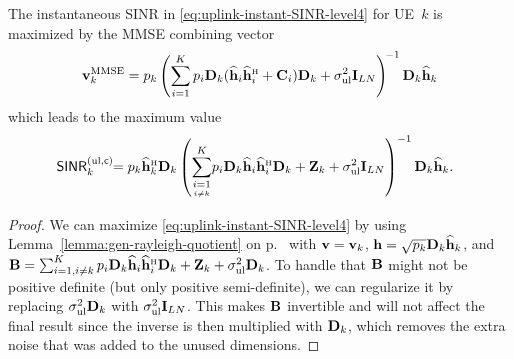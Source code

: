 \begin{corollary} \label{cor:MMSE-combining}
The instantaneous SINR in \eqref{eq:uplink-instant-SINR-level4} for UE~$k$ is maximized by the MMSE combining vector
\begin{equation} \label{eq:MMSE-combining}
\vect{v}_{k}^{{\rm MMSE}} =    p_{k} \left( \sum\limits_{i=1}^{K} p_{i}  \vect{D}_{k} ( \widehat{\vect{h}}_{i} \widehat{\vect{h}}_{i}^{\Htran} + \vect{C}_{i})\vect{D}_{k} + \sigmaUL \vect{I}_{LN} \right)^{\!-1} \vect{D}_{k}\widehat{\vect{h}}_{k}
\end{equation}
which leads to the maximum value
\begin{align} \label{eq:uplink-maximized-SINR}
\!\!\!\!\!\!\mathacr{SINR}_{k}^{({\rm ul},\cent)} \! \!= p_{k}  \widehat{\vect{h}}_{k}^{\Htran}\vect{D}_{k} \left( \condSum{i=1}{i \neq k}{K} p_{i}  \vect{D}_{k}\widehat{\vect{h}}_{i} \widehat{\vect{h}}_{i}^{\Htran}\vect{D}_{k} + \vect{Z}_{k} + \sigmaUL \vect{I}_{LN}  \right)^{-1}  \vect{D}_{k}\widehat{\vect{h}}_{k}.\!\!
\end{align}
\end{corollary}
\begin{proof}
We can maximize \eqref{eq:uplink-instant-SINR-level4} by using Lemma~\ref{lemma:gen-rayleigh-quotient} on p.~\pageref{lemma:gen-rayleigh-quotient} with $\mathbf{v} = \mathbf{v}_{k}$, $\mathbf{h} = \sqrt{p_{k}} \mathbf{D}_{k}\widehat{\mathbf{h}}_{k}$, and $\vect{B} = \sum_{i=1, i \neq k}^{K} p_{i}  \vect{D}_{k}\widehat{\vect{h}}_{i} \widehat{\vect{h}}_{i}^{\Htran}\vect{D}_{k} + \vect{Z}_{k} + \sigmaUL \vect{D}_k$. 
 To handle that $\mathbf{B}$ might not be positive definite (but only positive semi-definite), we can regularize it by replacing $ \sigma^2_{\mathrm{ul}} \mathbf{D}_k$ with  $\sigma^2_{\mathrm{ul}} \mathbf{I}_{LN}$. This makes $\mathbf{B}$ invertible and will not affect the final result since the inverse is then multiplied with $\mathbf{D}_k$, which removes the extra noise that was added to the unused dimensions. 
\end{proof}



